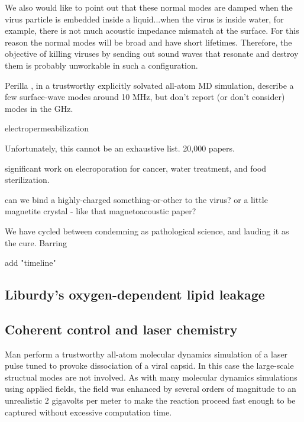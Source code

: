 \documentclass[paper.tex]{subfiles}
\begin{document}
\begin{multicols}{1}
\begin{fquote}
	We also would like to point out that these normal modes are damped when the virus particle is embedded inside a liquid...when the virus is inside water, for example, there is not much acoustic impedance mismatch at the surface. For this reason the normal modes will be broad and have short lifetimes. Therefore, the objective of killing viruses by sending out sound waves that resonate and destroy them is probably unworkable in such a configuration.	
\end{fquote}




Perilla \cite{}, in a trustworthy explicitly solvated all-atom MD simulation, describe a few surface-wave modes around 10 MHz, but don't report (or don't consider) modes in the GHz.




electropermeabilization




Unfortunately, this cannot be an exhaustive list. 20,000 papers.

significant work on elecroporation for cancer, water treatment, and food sterilization.


can we bind a highly-charged something-or-other to the virus?
or a little magnetite crystal - like that magnetoacoustic paper?


We have cycled between condemning as pathological science, and lauding it as the cure. Barring 


add "timeline"



\subsection{Liburdy's oxygen-dependent lipid leakage}
\label{sec:liburdy}


\subsection{Coherent control and laser chemistry}


Man \cite{Picosecond2016b} perform a trustworthy all-atom molecular dynamics simulation of a laser pulse tuned to provoke dissociation of a viral capsid. In this case the large-scale structual modes are not involved. As with many molecular dynamics simulations using applied fields, the field was enhanced by several orders of magnitude to an unrealistic 2 gigavolts per meter to make the reaction proceed fast enough to be captured without excessive computation time.



\end{multicols}
\end{document}
